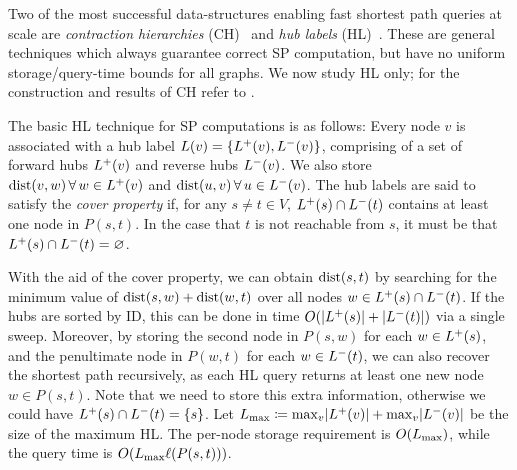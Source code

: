 Two of the most successful data-structures enabling fast shortest path queries at scale are \emph{contraction hierarchies} (CH)~\cite{geisberger_ch_definition} and \emph{hub labels} (HL)~\cite{cohen_definition_hl}.
These are general techniques which always guarantee correct SP computation, but have no uniform storage/query-time bounds for all graphs. 
We now study HL only; for the construction and results of CH refer to \cite{TechReport}. %

The basic HL technique for SP computations is as follows:
Every node $v$ is associated with a hub label $L(v) = \crl*{\Lf(v),\Lb(v)}$, comprising of a set of forward hubs $\Lf(v)$ and reverse hubs $\Lb(v)$.
We also store $\dist(v,w) \,\forall\, w\in\Lf(v)$ and $\dist(u,v)\,\forall\,u\in\Lb(v)$.
The hub labels are said to satisfy the \emph{cover property} if, for any $s\neq t\in V$, $\Lf(s)\cap\Lb(t)$ contains at least one node in $P(s,t)$.
In the case that $t$ is not reachable from $s$, it must be that $\Lf(s)\cap\Lb(t)=\varnothing$.

With the aid of the cover property, we can obtain $\dist(s,t)$ by searching for the minimum value of $\dist(s,w)+\dist(w,t)$ over all nodes $w\in\Lf(s)\cap\Lb(t)$.
If the hubs are sorted by ID, this can be done in time $\Or(\card{\Lf(s)}+\card{\Lb(t)})$ via a single sweep.
Moreover, by storing the second node in $P(s,w)$ for each $w\in \Lf(s)$, and the penultimate node in $P(w,t)$ for each $w\in \Lb(t)$, we can also recover the shortest path recursively, as each HL query returns at least one new node $w\in P(s,t)$.
Note that we need to store this extra information, otherwise we could have $\Lf(s)\cap\Lb(t)=\crl{s}$.
Let $\Lm \defeq \max_v\abs*{\Lf(v)}+\max_v\abs*{\Lb(v)}$ be the size of the maximum HL.
The per-node storage requirement is $\Or(\Lm)$, while the query time is $\Or(\Lm\ell(P(s,t)))$.

